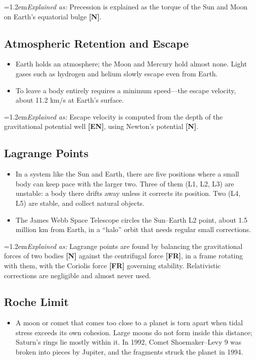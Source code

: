 \documentclass[11pt,a4paper]{article}
\newcommand{\reg}[1]{\textsf{\small\textbf{[#1]}}}
\newcommand{\RN}{\reg{N}}
\newcommand{\RFR}{\reg{FR}}
\newcommand{\REN}{\reg{EN}}
\newcommand{\expl}[1]{\par\begingroup\leftskip=1.2em\small\noindent\textit{Explained as:} #1\par\endgroup\smallskip}%
\begin{document}
\expl{Precession is explained as the torque of the Sun and Moon on Earth's equatorial bulge \RN{}.}

\subsection{Atmospheric Retention and Escape}

\begin{itemize}
  \item Earth holds an atmosphere; the Moon and Mercury hold almost none. Light gases such as hydrogen and helium slowly escape even from Earth.
  \item To leave a body entirely requires a minimum speed---the escape velocity, about 11.2 km/s at Earth's surface.
\end{itemize}

\expl{Escape velocity is computed from the depth of the gravitational potential well \REN{}, using Newton's potential \RN{}.}

\subsection{Lagrange Points}

\begin{itemize}
  \item In a system like the Sun and Earth, there are five positions where a small body can keep pace with the larger two. Three of them (L1, L2, L3) are unstable: a body there drifts away unless it corrects its position. Two (L4, L5) are stable, and collect natural objects.
  \item The James Webb Space Telescope circles the Sun--Earth L2 point, about 1.5 million km from Earth, in a ``halo'' orbit that needs regular small corrections.
\end{itemize}

\expl{Lagrange points are found by balancing the gravitational forces of two bodies \RN{} against the centrifugal force \RFR{}, in a frame rotating with them, with the Coriolis force \RFR{} governing stability. Relativistic corrections are negligible and almost never used.}

\subsection{Roche Limit}

\begin{itemize}
  \item A moon or comet that comes too close to a planet is torn apart when tidal stress exceeds its own cohesion. Large moons do not form inside this distance; Saturn's rings lie mostly within it. In 1992, Comet Shoemaker--Levy 9 was broken into pieces by Jupiter, and the fragments struck the planet in 1994.
\end{itemize}
\end{document}
